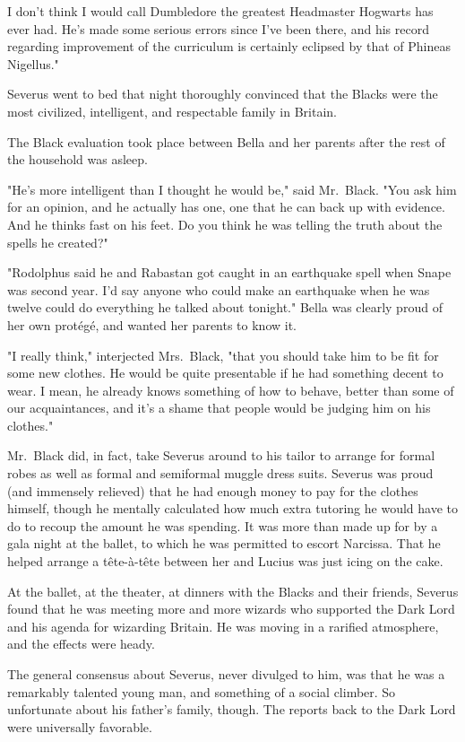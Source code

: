 \textooquote I don't think I would call Dumbledore the greatest Headmaster Hogwarts has ever had. He's made some serious errors since I've been there, and his record regarding improvement of the curriculum is certainly eclipsed by that of Phineas Nigellus."

Severus went to bed that night thoroughly convinced that the Blacks were the most civilized, intelligent, and respectable family in Britain.

The Black evaluation took place between Bella and her parents after the rest of the household was asleep.

"He's more intelligent than I thought he would be," said Mr.~Black. "You ask him for an opinion, and he actually has one, one that he can back up with evidence. And he thinks fast on his feet. Do you think he was telling the truth about the spells he created?"

"Rodolphus said he and Rabastan got caught in an earthquake spell when Snape was second year. I'd say anyone who could make an earthquake when he was twelve could do everything he talked about tonight." Bella was clearly proud of her own protégé, and wanted her parents to know it.

"I really think," interjected Mrs.~Black, "that you should take him to be fit for some new clothes. He would be quite presentable if he had something decent to wear. I mean, he already knows something of how to behave, better than some of our acquaintances, and it's a shame that people would be judging him on his clothes."

Mr.~Black did, in fact, take Severus around to his tailor to arrange for formal robes as well as formal and semiformal muggle dress suits. Severus was proud (and immensely relieved) that he had enough money to pay for the clothes himself, though he mentally calculated how much extra tutoring he would have to do to recoup the amount he was spending. It was more than made up for by a gala night at the ballet, to which he was permitted to escort Narcissa. That he helped arrange a tête-à-tête between her and Lucius was just icing on the cake.

At the ballet, at the theater, at dinners with the Blacks and their friends, Severus found that he was meeting more and more wizards who supported the Dark Lord and his agenda for wizarding Britain. He was moving in a rarified atmosphere, and the effects were heady.

The general consensus about Severus, never divulged to him, was that he was a remarkably talented young man, and something of a social climber. So unfortunate about his father's family, though. The reports back to the Dark Lord were universally favorable.

